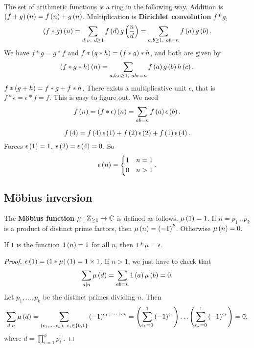 The set of arithmetic functions is a ring in the following way. Addition is $ \left( f + g \right)\left( n \right) = f\left( n \right) + g\left( n \right) $. Multiplication is \textbf{Dirichlet convolution} $ f * g $,
$$ \left( f * g \right)\left( n \right) = \sum_{d \mid n, \ d \ge 1} f\left( d \right)g\left( \dfrac{n}{d} \right) = \sum_{a, b \ge 1, \ ab = n} f\left( a \right)g\left( b \right). $$
We have $ f * g = g * f $ and $ f * \left( g * h \right) = \left( f * g \right) * h $, and both are given by
$$ \left( f * g * h \right)\left( n \right) = \sum_{a, b, c \ge 1, \ abc = n} f\left( a \right)g\left( b \right)h\left( c \right). $$
$ f * \left( g + h \right) = f * g + f * h $. There exists a multiplicative unit $ \epsilon $, that is $ f * \epsilon = \epsilon * f = f $. This is easy to figure out. We need
$$ f\left( n \right) = \left( f * \epsilon \right)\left( n \right) = \sum_{ab = n} f\left( a \right)\epsilon\left( b \right). $$

\begin{example2}
$$ f\left( 4 \right) = f\left( 4 \right)\epsilon\left( 1 \right) + f\left( 2 \right)\epsilon\left( 2 \right) + f\left( 1 \right)\epsilon\left( 4 \right). $$
Forces $ \epsilon\left( 1 \right) = 1 $, $ \epsilon\left( 2 \right) = \epsilon\left( 4 \right) = 0 $. So
$$ \epsilon\left( n \right) = \begin{cases}
1 & n = 1 \\
0 & n > 1
\end{cases}. $$
\end{example2}

\subsection{M\"obius inversion}

The \textbf{M\"obius function} $ \mu : \mathbb{Z}_{\ge 1} \to \mathbb{C} $ is defined as follows. $ \mu\left( 1 \right) = 1 $. If $ n = p_1 \dots p_k $ is a product of distinct prime factors, then $ \mu\left( n \right) = \left( -1 \right)^k $. Otherwise $ \mu\left( n \right) = 0 $.

\begin{lemma}
\label{lem:103}
If $ 1 $ is the function $ 1\left( n \right) = 1 $ for all $ n $, then $ 1 * \mu = \epsilon $.
\end{lemma}

\begin{proof}
$ \epsilon\left( 1 \right) = \left( 1 * \mu \right)\left( 1 \right) = 1 \times 1 $. If $ n > 1 $, we just have to check that
$$ \sum_{d \mid n} \mu\left( d \right) = \sum_{ab = n} 1\left( a \right)\mu\left( b \right) = 0. $$
Let $ p_1, \dots, p_k $ be the distinct primes dividing $ n $. Then
$$ \sum_{d \mid n} \mu\left( d \right) = \sum_{\left( \epsilon_1, \dots, \epsilon_k \right), \ \epsilon_i \in \left\{ 0, 1 \right\}} \left( -1 \right)^{\epsilon_1 + \dots + \epsilon_k} = \left( \sum_{\epsilon_1 = 0}^1 \left( -1 \right)^{\epsilon_1} \right) \dots \left( \sum_{\epsilon_k = 0}^1 \left( -1 \right)^{\epsilon_k} \right) = 0, $$
where $ d = \prod_{i = 1}^k p_i^{\epsilon_i} $.
\end{proof}


